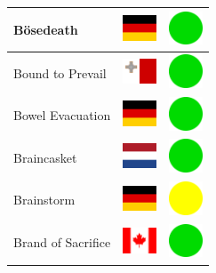 \documentclass[12pt, a4paper, twoside]{report}
\begin{document}
\begin{center}
\begin{longtable}{|p{5cm}|p{2cm}|p{2cm}|}
 Bösedeath                                                  & \includegraphics[width=1cm]{4x3/de} &   \includegraphics[width=1cm]{likes/y} \\ \hline
 Bound to Prevail                                           & \includegraphics[width=1cm]{4x3/mt} &   \includegraphics[width=1cm]{likes/y} \\ \hline
 Bowel Evacuation                                           & \includegraphics[width=1cm]{4x3/de} &   \includegraphics[width=1cm]{likes/y} \\ \hline
 Braincasket                                                & \includegraphics[width=1cm]{4x3/nl} &   \includegraphics[width=1cm]{likes/y} \\ \hline
 Brainstorm                                                 & \includegraphics[width=1cm]{4x3/de} &   \includegraphics[width=1cm]{likes/m} \\ \hline
 Brand of Sacrifice                                         & \includegraphics[width=1cm]{4x3/ca} &   \includegraphics[width=1cm]{likes/y} \\ \hline

\end{longtable}
\end{center}
\end{document}

